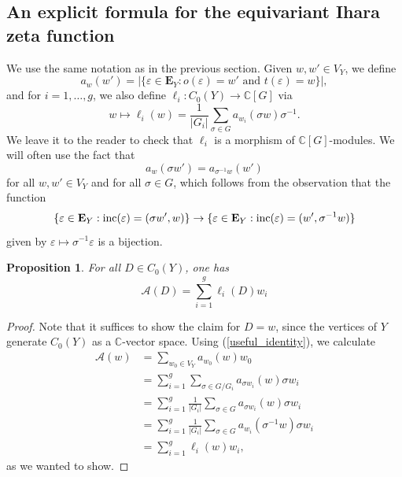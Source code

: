 \documentclass[11pt]{amsart}
\newtheorem{proposition}[theorem]{Proposition}
\numberwithin{equation}{section}
\theoremstyle{remark}
\theoremstyle{definition}
\begin{document}
\subsection{An explicit formula for the equivariant Ihara zeta function} \label{explicit}
We use the same notation as in the previous section.  Given $w, w' \in V_{Y}$, we define
$$a_{w}(w') = |\{\varepsilon \in \mathbf{E}_{Y}:o(\varepsilon) = w' \text{ and } t(\varepsilon) = w\}|, $$
and for $i=1,\ldots,g$, we also define $\ell_{i}:C_{0}(Y) \rightarrow \mathbb{C}[G]$ via
$$w \mapsto \ell_{i}(w) = \frac{1}{|G_{i}|}\sum_{\sigma \in G}a_{w_{i}}(\sigma w) \sigma^{-1}. $$
We leave it to the reader to check that $\ell_{i}$ is a morphism of $\mathbb{C}[G]$-modules.  We will often use the fact that 
\begin{equation} \label{useful_identity}
a_{w}(\sigma w') = a_{\sigma^{-1}w}(w')
\end{equation}
for all $w,w' \in V_{Y}$ and for all $\sigma \in G$, which follows from the observation that the function
$$\{\varepsilon \in \mathbf{E}_{Y}: {\rm inc}(\varepsilon) = (\sigma w',w) \} \rightarrow \{\varepsilon \in \mathbf{E}_{Y}: {\rm inc}(\varepsilon) = (w',\sigma^{-1}w) \} $$
given by $\varepsilon \mapsto \sigma^{-1} \varepsilon$ is a bijection.
\begin{proposition} \label{dec_adj}
For all $D \in C_{0}(Y)$, one has
$$\mathcal{A}(D) = \sum_{i=1}^{g} \ell_{i}(D) w_{i} $$
\end{proposition}
\begin{proof}
Note that it suffices to show the claim for $D = w$, since the vertices of $Y$ generate $C_{0}(Y)$ as a $\mathbb{C}$-vector space.  Using (\ref{useful_identity}), we calculate
\begin{equation*}
\begin{aligned} 
\mathcal{A}(w) &= \sum_{w_{0} \in V_{Y}}a_{w_{0}}(w) w_{0} \\
&= \sum_{i=1}^{g} \sum_{\sigma \in G/G_{i}} a_{\sigma w_{i}}(w)\sigma w_{i} \\
&= \sum_{i=1}^{g} \frac{1}{|G_{i}|} \sum_{\sigma \in G}a_{\sigma w_{i}}(w) \sigma w_{i} \\
&= \sum_{i=1}^{g} \frac{1}{|G_{i}|} \sum_{\sigma \in G}a_{w_{i}}(\sigma^{-1} w) \sigma w_{i} \\
&= \sum_{i=1}^{g} \ell_{i}(w)w_{i},
\end{aligned}
\end{equation*}
as we wanted to show.
\end{proof}
\end{document}
